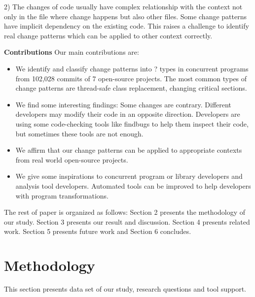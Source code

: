\documentclass[conference]{IEEEtran}
\begin{document}
2) The changes of code usually have complex relationship with the context not only in the file where change happens but also other files. Some change patterns have implicit dependency on the existing code. This raises a challenge to identify real change patterns which can be applied to other context correctly.

\textbf{Contributions} Our main contributions are:

\begin{itemize}
	\item We identify and classify change patterns into ? types in concurrent programs from 102,028 commits of 7 open-source projects. The most common types of change patterns are thread-safe class replacement, changing critical sections.
	\item We find some interesting findings: Some changes are contrary. Different developers may modify their code in an opposite direction. Developers are using some code-checking tools like findbugs to help them inspect their code, but sometimes these tools are not enough.
	\item We affirm that our change patterns can be applied to appropriate  contexts from real world open-source projects.
	\item We give some inspirations to concurrent program or library developers and analysis tool developers. Automated tools can be improved to help developers with program transformations.
\end{itemize}

The rest of paper is organized as follows: Section 2 presents the methodology of our study. Section 3 presents our result and discussion. Section 4 presents related work. Section 5 presents future work and Section 6 concludes.

\section{Methodology}
This section presents data set of our study, research questions and tool support.
\end{document}

